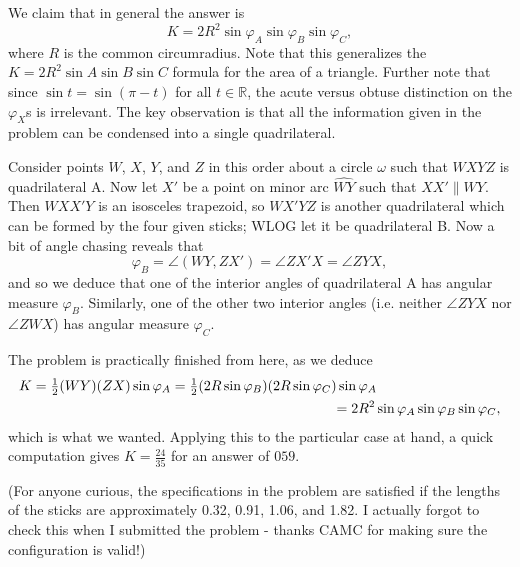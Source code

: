 \documentclass[11pt]{article}
\theoremstyle{definition}
\begin{document}
\begin{solution}[name={Solution by David Altizio}]
	We claim that in general the answer is\[K = 2R^2\sin\varphi_A\sin\varphi_B\sin\varphi_C,\]where $R$ is the common circumradius. Note that this generalizes the $K = 2R^2\sin A\sin B\sin C$ formula for the area of a triangle. Further note that since $\sin t = \sin(\pi-t)$ for all $t\in\mathbb R$, the acute versus obtuse distinction on the $\varphi_X$s is irrelevant. The key observation is that all the information given in the problem can be condensed into a single quadrilateral.
	
	Consider points $W$, $X$, $Y$, and $Z$ in this order about a circle $\omega$ such that $WXYZ$ is quadrilateral A. Now let $X'$ be a point on minor arc $\widehat{WY}$ such that $XX'\parallel WY$. Then $WXX'Y$ is an isosceles trapezoid, so $WX'YZ$ is another quadrilateral which can be formed by the four given sticks; WLOG let it be quadrilateral B. Now a bit of angle chasing reveals that\[\varphi_B = \angle(WY,ZX') = \angle ZX'X = \angle ZYX,\]and so we deduce that one of the interior angles of quadrilateral A has angular measure $\varphi_B$. Similarly, one of the other two interior angles (i.e. neither $\angle ZYX$ nor $\angle ZWX$) has angular measure $\varphi_C$.
	
	The problem is practically finished from here, as we deduce\begin{align*}K &= \tfrac12(WY)(ZX)\sin\varphi_A = \tfrac12(2R\sin\varphi_B)(2R\sin\varphi_C)\sin\varphi_A \\&\hspace{50ex}= 2R^2\sin\varphi_A\sin\varphi_B\sin\varphi_C,\end{align*}which is what we wanted. Applying this to the particular case at hand, a quick computation gives $K = \tfrac{24}{35}$ for an answer of $\boxed{059}$.
	
	(For anyone curious, the specifications in the problem are satisfied if the lengths of the sticks are approximately 0.32, 0.91, 1.06, and 1.82. I actually forgot to check this when I submitted the problem - thanks CAMC for making sure the configuration is valid!)
\end{solution}
\end{document}
